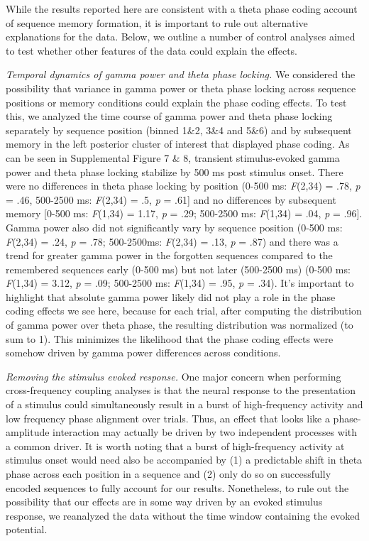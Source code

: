 While the results reported here are consistent with a theta phase coding
account of sequence memory formation, it is important to rule out
alternative explanations for the data. Below, we outline a number of
control analyses aimed to test whether other features of the data could
explain the effects.

\emph{Temporal dynamics of gamma power and theta phase locking.} We
considered the possibility that variance in gamma power or theta phase
locking across sequence positions or memory conditions could explain the
phase coding effects. To test this, we analyzed the time course of gamma
power and theta phase locking separately by sequence position (binned
1\&2, 3\&4 and 5\&6) and by subsequent memory in the left posterior
cluster of interest that displayed phase coding. As can be seen in
Supplemental Figure 7 \& 8, transient stimulus-evoked gamma power and
theta phase locking stabilize by 500 ms post stimulus onset. There were
no differences in theta phase locking by position (0-500 ms:
\emph{F}(2,34) = .78, \emph{p} = .46, 500-2500 ms: \emph{F}(2,34) = .5,
\emph{p} = .61{]} and no differences by subsequent memory {[}0-500 ms:
\emph{F}(1,34) = 1.17, \emph{p} = .29; 500-2500 ms: \emph{F}(1,34) =
.04, \emph{p} = .96{]}. Gamma power also did not significantly vary by
sequence position (0-500 ms: \emph{F}(2,34) = .24, \emph{p} = .78;
500-2500ms: \emph{F}(2,34) = .13, \emph{p} = .87) and there was a trend
for greater gamma power in the forgotten sequences compared to the
remembered sequences early (0-500 ms) but not later (500-2500 ms) (0-500
ms: \emph{F}(1,34) = 3.12, \emph{p} = .09; 500-2500 ms: \emph{F}(1,34) =
.95, \emph{p} = .34). It's important to highlight that absolute gamma
power likely did not play a role in the phase coding effects we see
here, because for each trial, after computing the distribution of gamma
power over theta phase, the resulting distribution was normalized (to
sum to 1). This minimizes the likelihood that the phase coding effects
were somehow driven by gamma power differences across conditions.

\emph{Removing the stimulus evoked response.} One major concern when
performing cross-frequency coupling analyses is that the neural response
to the presentation of a stimulus could simultaneously result in a burst
of high-frequency activity and low frequency phase alignment over
trials. Thus, an effect that looks like a phase-amplitude interaction
may actually be driven by two independent processes with a common
driver. It is worth noting that a burst of high-frequency activity at
stimulus onset would need also be accompanied by (1) a predictable shift
in theta phase across each position in a sequence and (2) only do so on
successfully encoded sequences to fully account for our results.
Nonetheless, to rule out the possibility that our effects are in some
way driven by an evoked stimulus response, we reanalyzed the data
without the time window containing the evoked potential.

